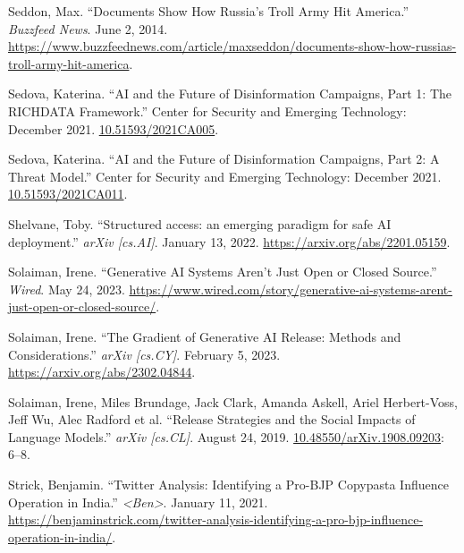 \documentclass{article}
\begin{document}
\begin{thebibliography}{9}
  Seddon, Max. ``Documents Show How Russia’s Troll Army Hit America.'' \textit{Buzzfeed News}. June 2, 2014. \href{https://www.buzzfeednews.com/article/maxseddon/documents-show-how-russias-troll-army-hit-america}{https://www.buzzfeednews.com/article/maxseddon/documents-show-how-russias-troll-army-hit-america}.

  Sedova, Katerina. ``AI and the Future of Disinformation Campaigns, Part 1: The RICHDATA Framework.'' Center for Security and Emerging Technology: December 2021. \href{https://cset.georgetown.edu/publication/ai-and-the-future-of-disinformation-campaigns/}{10.51593/2021CA005}.

  Sedova, Katerina. ``AI and the Future of Disinformation Campaigns, Part 2: A Threat Model.'' Center for Security and Emerging Technology: December 2021. \href{https://cset.georgetown.edu/publication/ai-and-the-future-of-disinformation-campaigns-2/}{10.51593/2021CA011}.

  Shelvane, Toby. ``Structured access: an emerging paradigm for safe AI deployment.'' \textit{arXiv [cs.AI]}. January 13, 2022. \href{https://arxiv.org/abs/2201.05159}{https://arxiv.org/abs/2201.05159}. 

  Solaiman, Irene. ``Generative AI Systems Aren't Just Open or Closed Source.'' \textit{Wired}. May 24, 2023. \href{https://www.wired.com/story/generative-ai-systems-arent-just-open-or-closed-source/}{https://www.wired.com/story/generative-ai-systems-arent-just-open-or-closed-source/}. 

  Solaiman, Irene. ``The Gradient of Generative AI Release: Methods and Considerations.'' \textit{arXiv [cs.CY]}. February 5, 2023. \href{https://arxiv.org/abs/2302.04844}{https://arxiv.org/abs/2302.04844}. 

  Solaiman, Irene, Miles Brundage, Jack Clark, Amanda Askell, Ariel Herbert-Voss, Jeff Wu, Alec Radford et al. ``Release Strategies and the Social Impacts of Language Models.'' \textit{arXiv [cs.CL]}. August 24, 2019. \href{https://arxiv.org/abs/1908.09203}{10.48550/arXiv.1908.09203}: 6–8.

  Strick, Benjamin. ``Twitter Analysis: Identifying a Pro-BJP Copypasta Influence Operation in India.'' \textit{<Ben>}. January 11, 2021. \href{https://benjaminstrick.com/twitter-analysis-identifying-a-pro-bjp-influence-operation-in-india/}{https://benjaminstrick.com/twitter-analysis-identifying-a-pro-bjp-influence-operation-in-india/}. 


\end{thebibliography}
\end{document}
